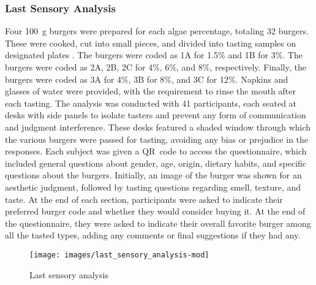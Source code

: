 \subsubsection{Last Sensory Analysis}
Four \qty{100}{\gram} burgers were prepared for each algae percentage, totaling \num{32} burgers. These were cooked, cut into small pieces, and divided into tasting samples on designated plates . The  burgers were coded as 1A for \num{1.5}\% and 1B for \num{3}\%. The  burgers were coded as 2A, 2B, 2C for \num{4}\%, \num{6}\%, and \num{8}\%, respectively. Finally, the  burgers were coded as 3A for \num{4}\%, 3B for \num{8}\%, and 3C for \num{12}\%.
Napkins and glasses of water were provided, with the requirement to rinse the mouth after each tasting. The analysis was conducted with \num{41} participants, each seated at desks with side panels to isolate tasters and prevent any form of communication and judgment interference. These desks featured a shaded window through which the various burgers were passed for tasting, avoiding any bias or prejudice in the responses. Each subject was given a QR~code to access the questionnaire, which included general questions about gender, age, origin, dietary habits, and specific questions about the burgers. Initially, an image of the burger was shown for an aesthetic judgment, followed by tasting questions regarding smell, texture, and taste. At the end of each section, participants were asked to indicate their preferred burger code and whether they would consider buying it. At the end of the questionnaire, they were asked to indicate their overall favorite burger among all the tasted types, adding any comments or final suggestions if they had any.

\begin{figure}[H]
	\centering
	\texttt{[image: images/last\_sensory\_analysis-mod]}
	\caption{Last sensory analysis}
	\label{fig:last_sensory_analysis}
\end{figure}

